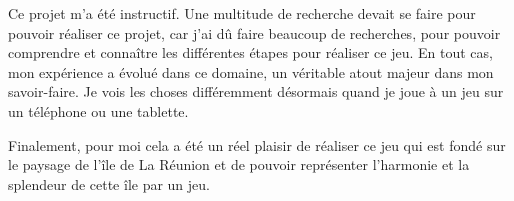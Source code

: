 \documentclass{article}
\begin{document}
Ce projet m'a été instructif. Une multitude de recherche devait se faire pour pouvoir réaliser ce projet, car j’ai dû faire beaucoup de recherches, pour pouvoir comprendre et connaître les différentes étapes pour réaliser ce jeu. En tout cas, mon expérience a évolué dans ce domaine, un véritable atout majeur dans
mon savoir-faire.
Je vois les choses différemment désormais quand je joue à un jeu sur un téléphone ou une tablette. 

Finalement, pour moi cela a été un réel plaisir de réaliser ce jeu qui est fondé sur le paysage de l'île de La Réunion et de pouvoir représenter l’harmonie et la splendeur de cette île par un jeu.




\end{document}
